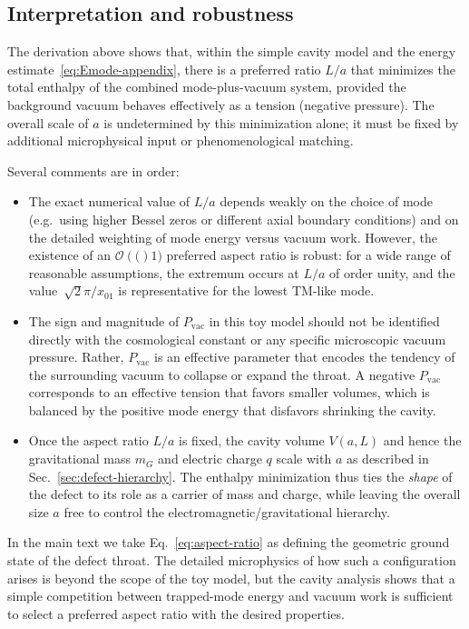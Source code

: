 \documentclass[11pt]{article}
\newcommand{\Order}[1]{\mathcal{O}\left(#1\right)}
\begin{document}
\subsection{Interpretation and robustness}

The derivation above shows that, within the simple cavity model and the energy estimate~\eqref{eq:Emode-appendix}, there is a preferred ratio $L/a$ that minimizes the total enthalpy of the combined mode-plus-vacuum system, provided the background vacuum behaves effectively as a tension (negative pressure).  The overall scale of $a$ is undetermined by this minimization alone; it must be fixed by additional microphysical input or phenomenological matching.

Several comments are in order:

\begin{itemize}
  \item The exact numerical value of $L/a$ depends weakly on the choice of mode (e.g.\ using higher Bessel zeros or different axial boundary conditions) and on the detailed weighting of mode energy versus vacuum work.  However, the existence of an $\Order(1)$ preferred aspect ratio is robust: for a wide range of reasonable assumptions, the extremum occurs at $L/a$ of order unity, and the value~$\sqrt{2}\pi/x_{01}$ is representative for the lowest TM-like mode.

  \item The sign and magnitude of $P_{\mathrm{vac}}$ in this toy model should not be identified directly with the cosmological constant or any specific microscopic vacuum pressure.  Rather, $P_{\mathrm{vac}}$ is an effective parameter that encodes the tendency of the surrounding vacuum to collapse or expand the throat.  A negative $P_{\mathrm{vac}}$ corresponds to an effective tension that favors smaller volumes, which is balanced by the positive mode energy that disfavors shrinking the cavity.

  \item Once the aspect ratio $L/a$ is fixed, the cavity volume $V(a,L)$ and hence the gravitational mass $m_G$ and electric charge $q$ scale with $a$ as described in Sec.~\ref{sec:defect-hierarchy}.  The enthalpy minimization thus ties the \emph{shape} of the defect to its role as a carrier of mass and charge, while leaving the overall size $a$ free to control the electromagnetic/gravitational hierarchy.
\end{itemize}

In the main text we take Eq.~\eqref{eq:aspect-ratio} as defining the geometric ground state of the defect throat.  The detailed microphysics of how such a configuration arises is beyond the scope of the toy model, but the cavity analysis shows that a simple competition between trapped-mode energy and vacuum work is sufficient to select a preferred aspect ratio with the desired properties.
\end{document}
